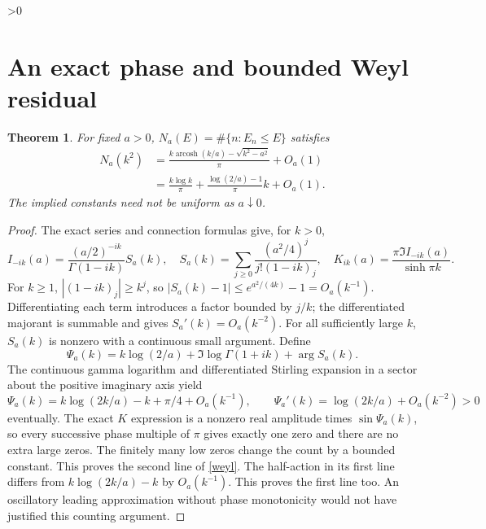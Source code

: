 \documentclass[10pt]{article}
\newtheorem{theorem}{Theorem}
\begin{document}
\ifnum\CRevisionRound>0
\section{An exact phase and bounded Weyl residual}
\begin{theorem}
For fixed $a>0$, $N_a(E)=\#\{n:E_n\le E\}$ satisfies
\begin{align}
 N_a(k^2)&=\frac{k\operatorname{arcosh}(k/a)-\sqrt{k^2-a^2}}\pi+O_a(1)
 \label{weyl}\\
 &=\frac{k\log k}\pi+\frac{\log(2/a)-1}\pi k+O_a(1).
 \nonumber
\end{align}
The implied constants need not be uniform as $a\downarrow0$.
\end{theorem}
\begin{proof}
The exact series and connection formulas \cite{dlmf} give, for $k>0$,
\[
 I_{-ik}(a)=\frac{(a/2)^{-ik}}{\Gamma(1-ik)}S_a(k),\quad
 S_a(k)=\sum_{j\ge0}\frac{(a^2/4)^j}{j!(1-ik)_j},\quad
 K_{ik}(a)=\frac{\pi\Im I_{-ik}(a)}{\sinh\pi k}.
\]
For $k\ge1$, $|(1-ik)_j|\ge k^j$, so
$|S_a(k)-1|\le e^{a^2/(4k)}-1=O_a(k^{-1})$.
Differentiating each term introduces a factor bounded by $j/k$;
the differentiated majorant is summable and gives $S_a'(k)=O_a(k^{-2})$.
For all sufficiently large $k$, $S_a(k)$ is nonzero with a continuous
small argument. Define
\[
 \Psi_a(k)=k\log(2/a)+\Im\log\Gamma(1+ik)+\arg S_a(k).
\]
The continuous gamma logarithm and differentiated Stirling expansion in
a sector about the positive imaginary axis yield
\[
 \Psi_a(k)=k\log(2k/a)-k+\pi/4+O_a(k^{-1}),\qquad
 \Psi_a'(k)=\log(2k/a)+O_a(k^{-2})>0
\]
eventually. The exact $K$ expression is a nonzero real amplitude times
$\sin\Psi_a(k)$, so every successive phase multiple of $\pi$ gives
exactly one zero and there are no extra large zeros. The finitely many
low zeros change the count by a bounded constant. This proves the second
line of \eqref{weyl}. The half-action in its first line differs from
$k\log(2k/a)-k$ by $O_a(k^{-1})$. This proves the first line too.
An oscillatory leading approximation without phase monotonicity would
not have justified this counting argument.
\end{proof}
\end{document}
